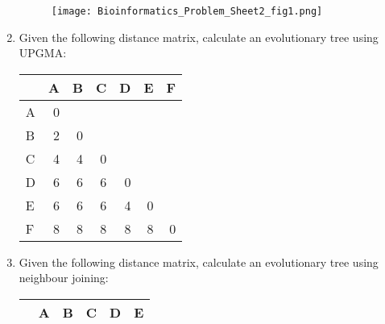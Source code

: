 \documentclass[11pt,runningheads,a4paper]{article}
\begin{document}
\begin{enumerate}
\begin{figure}[h]
		\centering
		\texttt{[image: Bioinformatics\_Problem\_Sheet2\_fig1.png]}
		\end{figure}
	\item Given the following distance matrix, calculate an evolutionary tree using UPGMA:
		\begin{table}[H]
		\centering
		\begin{tabular}{|l|r|r|r|l|l|l|}
		\hline
		 & \multicolumn{1}{l|}{A} & \multicolumn{1}{l|}{B} & \multicolumn{1}{l|}{C} & D & E & F \\ \hline
		A & 0 & \multicolumn{1}{l|}{} & \multicolumn{1}{l|}{} &  &  &  \\ \hline
		B & 2 & 0 & \multicolumn{1}{l|}{} &  &  &  \\ \hline
		C & 4 & 4 & 0 &  &  &  \\ \hline
		D & 6 & 6 & 6 & \multicolumn{1}{r|}{0} &  &  \\ \hline
		E & 6 & 6 & 6 & \multicolumn{1}{r|}{4} & \multicolumn{1}{r|}{0} &  \\ \hline
		F & 8 & 8 & 8 & \multicolumn{1}{r|}{8} & \multicolumn{1}{r|}{8} & \multicolumn{1}{r|}{0} \\ \hline
		\end{tabular}
		\label{}
		\end{table}
	\item  Given the following distance matrix, calculate an evolutionary tree using neighbour joining:
		\begin{table}[H]
		\centering
		\begin{tabular}{|l|r|r|r|l|l|}
		\hline
		 & \multicolumn{1}{l|}{A} & \multicolumn{1}{l|}{B} & \multicolumn{1}{l|}{C} & D & E \\ \hline

\end{tabular}
\end{table}
\end{enumerate}
\end{document}
